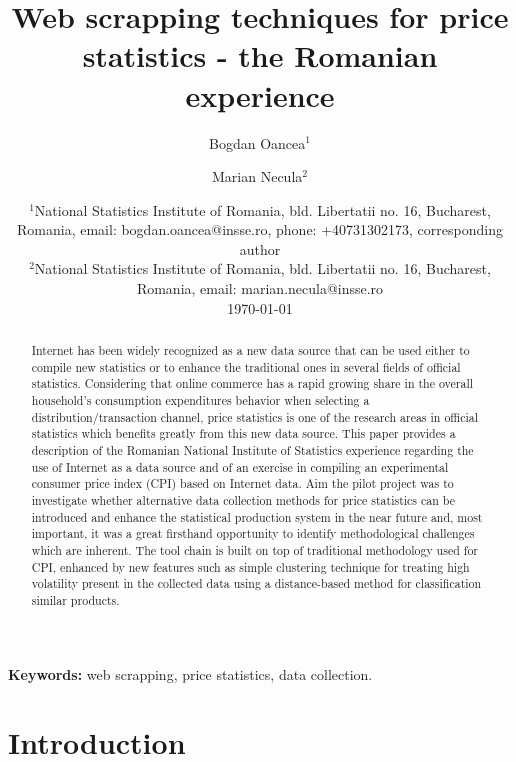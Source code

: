 \documentclass[]{article}
\title{Web scrapping techniques for price statistics -  the Romanian experience}
\author{Bogdan Oancea$^1$ \and Marian Necula$^2$}
\date{%
	$^1$National Statistics Institute of Romania, bld. Libertatii no. 16, Bucharest, Romania, email: bogdan.oancea@insse.ro, phone: +40731302173, corresponding author\\%
	$^2$National Statistics Institute of Romania, bld. Libertatii no. 16, Bucharest, Romania, email: marian.necula@insse.ro\\[2ex]%
	\today
}
\begin{document}
\maketitle

\begin{abstract}
Internet has been widely recognized as a new data source that can be used either to compile new statistics or to enhance the 
traditional ones in several fields of official statistics. Considering that online commerce has a rapid growing share in the 
overall household’s consumption expenditures behavior when selecting a distribution/transaction channel, price statistics is 
one of the research areas in official statistics which benefits greatly from this new data source. 
This paper provides a description of the Romanian National Institute of Statistics experience regarding the use of Internet 
as a data source and of an exercise in compiling an experimental consumer price index (CPI) based on Internet data. Aim the pilot project was to 
investigate whether alternative data collection methods for price statistics can be introduced and enhance the statistical 
production system in the near future and, most important, it was a great firsthand opportunity to identify methodological 
challenges which are inherent.  The tool chain is built on top of traditional methodology used for CPI, enhanced by new features such as simple clustering 
technique for treating high volatility present in the collected data using a distance-based method for classification similar products.

\end{abstract}

{\bf Keywords:} web scrapping, price statistics, data collection.

\clearpage
 
\section{Introduction}
\end{document}
